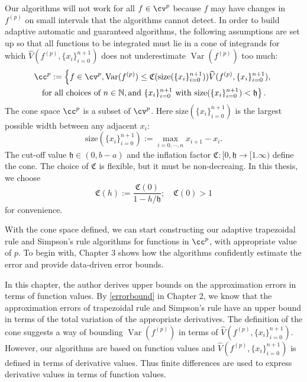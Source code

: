 \documentclass{iitthesis}
\DeclareMathOperator{\Var}{Var}
\theoremstyle{definition}
\theoremstyle{remark}
\begin{document}
Our algorithms will not work for all $f \in \cv^{p}$ because $f$ may have changes in $f^{(p)}$ on small intervals that the algorithms cannot detect. In order to build adaptive automatic and guaranteed algorithms, the following assumptions are set up so that all functions to be integrated must lie in a cone of integrands for which $\widehat{V}(f^{(p)},\{x_i\}_{i=0}^{n+1})$ does not underestimate $\Var(f^{(p)})$ too much:
\begin{multline}\label{defcone}
\cc^{p}:=\left\{f\in \cv^{p}, \Var(f^{(p)})\leq \mathfrak{C}(\text{size}(\{x_i\}_{i=0}^{n+1}))\widehat{V}(f^{(p)},\{x_i\}_{i=0}^{n+1}),\right.\\ \left.\text{for all choices of } n\in \mathbb{N}, \text{and }\{x_i\}_{i=0}^{n+1} \text{ with }\text{size}(\{x_i\}_{i=0}^{n+1})<\mathfrak{h}\right\}.
\end{multline}
The cone space $\cc^{p}$ is a subset of $\cv^{p}$. Here $\text{size}(\{x_i\}_{i=0}^{n+1})$ is the largest possible width between any adjacent $x_i$:
\begin{equation}\label{defsize}
  \text{size}(\{x_i\}_{i=0}^{n+1}):=\max_{i=0,\cdots, n} x_{i+1}-x_{i}.
\end{equation}
The cut-off value $\mathfrak{h} \in (0, b-a)$ and the inflation factor $\mathfrak{C}: [0,\mathfrak{h} \rightarrow [1.\infty)$ define the cone. The choice of $\mathfrak{C}$ is flexible, but it must be non-decreaing. In this thesis, we choose
\begin{equation}\label{definflationfactor}
  \mathfrak{C}(h):=\frac{\mathfrak{C}(0)}{1-h/\mathfrak{h}}; \quad \mathfrak{C}(0)>1
\end{equation}
for convenience.

With the cone space defined, we can start constructing our adaptive trapezoidal rule and Simpson's rule algorithms for functions in $\cc^{p}$, with appropriate value of $p$. To begin with, Chapter 3 shows how the algorithms confidently estimate the error and provide data-driven error bounds.





In this chapter, the author derives upper bounds on the approximation errors in terms of function values. By \eqref{errorbound} in Chapter 2, we know that the approximation errors of trapezoidal rule and Simpson's rule have an upper bound in terms of the total variation of the appropriate derivatives. The definition of the cone suggests a way of bounding $\Var(f^{(p)})$ in terms of $\widehat{V}(f^{(p)},\{x_i\}_{i=0}^{n+1})$. However, our algorithms are based on function values and $\widehat{V}(f^{(p)},\{x_i\}_{i=0}^{n+1})$ is defined in terms of derivative values. Thus finite differences are used to express derivative values in terms of function values.
\end{document}
